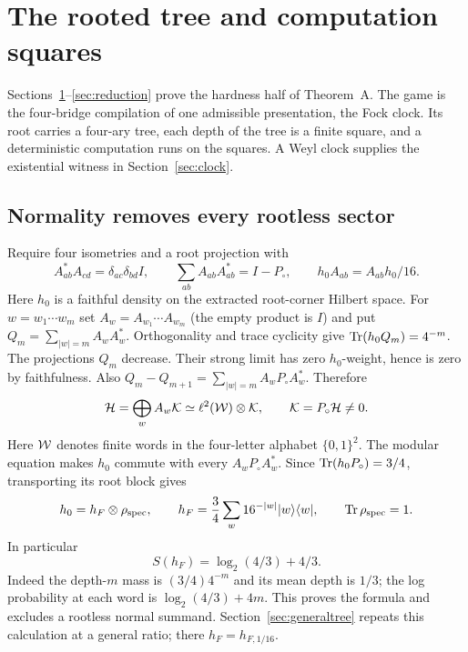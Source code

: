 \section{The rooted tree and computation squares}\label{sec:tree}
Sections~\ref{sec:tree}--\ref{sec:reduction} prove the hardness half of Theorem~A. The game is the four-bridge compilation of one admissible presentation, the Fock clock. Its root carries a four-ary tree, each depth of the tree is a finite square, and a deterministic computation runs on the squares. A Weyl clock supplies the existential witness in Section~\ref{sec:clock}.

\subsection{Normality removes every rootless sector}
Require four isometries and a root projection with
\begin{equation}\label{eq:fockrelations}
 A_{ab}^*A_{cd}=\delta_{ac}\delta_{bd}I,\qquad
 \sum_{ab}A_{ab}A_{ab}^*=I-P_{\circ},\qquad h_0A_{ab}=A_{ab}h_0/16.
\end{equation}
Here $h_0$ is a faithful density on the extracted root-corner Hilbert space. For $w=w_1\cdots w_m$ set $A_w=A_{w_1}\cdots A_{w_m}$ (the empty product is $I$) and put $Q_m=\sum_{|w|=m}A_wA_w^*$. Orthogonality and trace cyclicity give $\operatorname{Tr}(h_0Q_m)=4^{-m}$. The projections $Q_m$ decrease. Their strong limit has zero $h_0$-weight, hence is zero by faithfulness. Also $Q_m-Q_{m+1}=\sum_{|w|=m}A_wP_{\circ}A_w^*$. Therefore
\begin{equation}\label{eq:fockdecomp}
 \mathcal H=\bigoplus_w A_w\mathcal K\simeq\ell^2(\mathcal W)\otimes\mathcal K,
 \qquad \mathcal K=P_{\circ}\mathcal H\ne0.
\end{equation}
Here $\mathcal W$ denotes finite words in the four-letter alphabet $\{0,1\}^2$. The modular equation makes $h_0$ commute with every $A_wP_{\circ}A_w^*$. Since $\operatorname{Tr}(h_0P_{\circ})=3/4$, transporting its root block gives
\begin{equation}\label{eq:fockdensity}
 h_0=h_F\otimes\rho_{\rm spec},\qquad
 h_F=\frac34\sum_w16^{-|w|}|w\rangle\langle w|,
 \qquad \operatorname{Tr}\rho_{\rm spec}=1.
\end{equation}
In particular
\begin{equation}\label{eq:fockentropy}
 S(h_F)=\log_2(4/3)+4/3.
\end{equation}
Indeed the depth-$m$ mass is $(3/4)4^{-m}$ and its mean depth is $1/3$; the log probability at each word is $\log_2(4/3)+4m$. This proves the formula and excludes a rootless normal summand. Section~\ref{sec:generaltree} repeats this calculation at a general ratio; there $h_F=h_{F,1/16}$.

